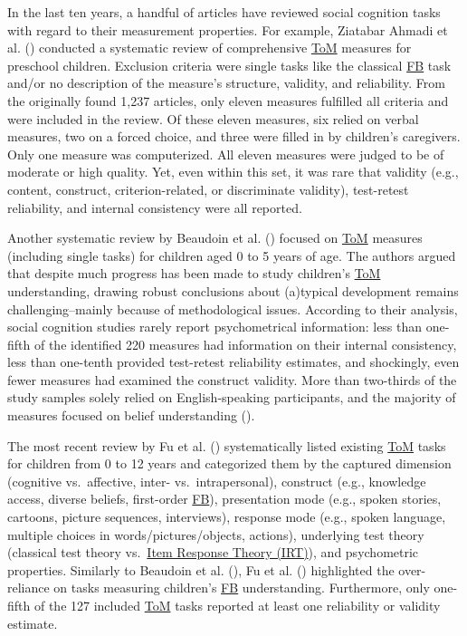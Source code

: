 \documentclass[
]{scrbook}
\begin{document}
In the last ten years, a handful of articles have reviewed social cognition tasks with regard to their measurement properties. For example, Ziatabar Ahmadi et al. () conducted a systematic review of comprehensive \hyperref[acronyms_ToM]{ToM} measures for preschool children. Exclusion criteria were single tasks like the classical \hyperref[acronyms_FB]{FB} task and/or no description of the measure's structure, validity, and reliability. From the originally found 1,237 articles, only eleven measures fulfilled all criteria and were included in the review. Of these eleven measures, six relied on verbal measures, two on a forced choice, and three were filled in by children's caregivers. Only one measure was computerized. All eleven measures were judged to be of moderate or high quality. Yet, even within this set, it was rare that validity (e.g., content, construct, criterion-related, or discriminate validity), test-retest reliability, and internal consistency were all reported.

Another systematic review by Beaudoin et al. () focused on \hyperref[acronyms_ToM]{ToM} measures (including single tasks) for children aged 0 to 5 years of age. The authors argued that despite much progress has been made to study children's \hyperref[acronyms_ToM]{ToM} understanding, drawing robust conclusions about (a)typical development remains challenging\thinspace --\thinspace mainly because of methodological issues. According to their analysis, social cognition studies rarely report psychometrical information: less than one-fifth of the identified 220 measures had information on their internal consistency, less than one-tenth provided test-retest reliability estimates, and shockingly, even fewer measures had examined the construct validity. More than two-thirds of the study samples solely relied on English-speaking participants, and the majority of measures focused on belief understanding ().

The most recent review by Fu et al. () systematically listed existing \hyperref[acronyms_ToM]{ToM} tasks for children from 0 to 12 years and categorized them by the captured dimension (cognitive vs.~affective, inter- vs.~intrapersonal), construct (e.g., knowledge access, diverse beliefs, first-order \hyperref[acronyms_FB]{FB}), presentation mode (e.g., spoken stories, cartoons, picture sequences, interviews), response mode (e.g., spoken language, multiple choices in words/pictures/objects, actions), underlying test theory (classical test theory vs.~\hyperref[acronyms_IRT]{Item Response Theory (IRT)}), and psychometric properties. Similarly to Beaudoin et al. (), Fu et al. () highlighted the over-reliance on tasks measuring children's \hyperref[acronyms_FB]{FB} understanding. Furthermore, only one-fifth of the 127 included \hyperref[acronyms_ToM]{ToM} tasks reported at least one reliability or validity estimate.
\end{document}
